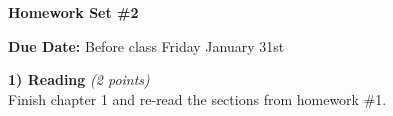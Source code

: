

\def\xyprime{\ensuremath{\begin{pmatrix} x' \\ y' \end{pmatrix}}}



\thispagestyle{fancy}






\begin{center}
{\huge \textbf{Homework Set \#2}}
\large

{\textbf{ Due Date:} Before class Friday January 31st  }
\end{center}

\textbf{1) Reading } \hfill \textit{(2 points)}\\
Finish chapter 1 and re-read the sections from homework \#1.

\vspace*{0.25in}


